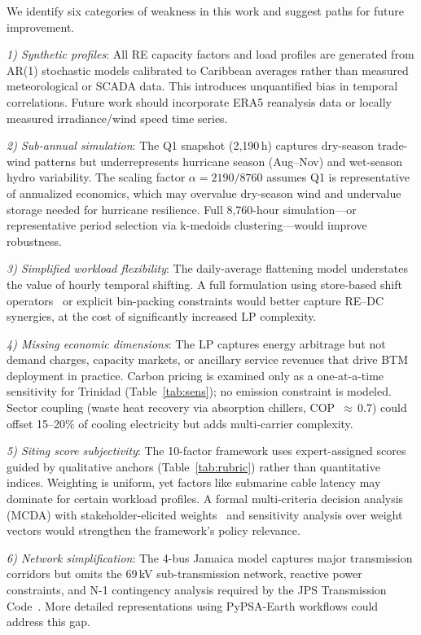 \documentclass[conference,10pt]{IEEEtran}
\begin{document}
We identify six categories of weakness in this work and suggest paths for future improvement.

\textit{1) Synthetic profiles}: All RE capacity factors and load profiles are generated from AR(1) stochastic models calibrated to Caribbean averages rather than measured meteorological or SCADA data. This introduces unquantified bias in temporal correlations. Future work should incorporate ERA5 reanalysis data or locally measured irradiance/wind speed time series.

\textit{2) Sub-annual simulation}: The Q1 snapshot (2{,}190\,h) captures dry-season trade-wind patterns but underrepresents hurricane season (Aug--Nov) and wet-season hydro variability. The scaling factor $\alpha = 2190/8760$ assumes Q1 is representative of annualized economics, which may overvalue dry-season wind and undervalue storage needed for hurricane resilience. Full 8{,}760-hour simulation---or representative period selection via k-medoids clustering---would improve robustness.

\textit{3) Simplified workload flexibility}: The daily-average flattening model understates the value of hourly temporal shifting. A full formulation using store-based shift operators~\cite{google247} or explicit bin-packing constraints would better capture RE--DC synergies, at the cost of significantly increased LP complexity.

\textit{4) Missing economic dimensions}: The LP captures energy arbitrage but not demand charges, capacity markets, or ancillary service revenues that drive BTM deployment in practice. Carbon pricing is examined only as a one-at-a-time sensitivity for Trinidad (Table~\ref{tab:sens}); no emission constraint is modeled. Sector coupling (waste heat recovery via absorption chillers, COP~$\approx$\,0.7) could offset 15--20\% of cooling electricity but adds multi-carrier complexity.

\textit{5) Siting score subjectivity}: The 10-factor framework uses expert-assigned scores guided by qualitative anchors (Table~\ref{tab:rubric}) rather than quantitative indices. Weighting is uniform, yet factors like submarine cable latency may dominate for certain workload profiles. A formal multi-criteria decision analysis (MCDA) with stakeholder-elicited weights~\cite{uli2024} and sensitivity analysis over weight vectors would strengthen the framework's policy relevance.

\textit{6) Network simplification}: The 4-bus Jamaica model captures major transmission corridors but omits the 69\,kV sub-transmission network, reactive power constraints, and N-1 contingency analysis required by the JPS Transmission Code~\cite{jps_grid}. More detailed representations using PyPSA-Earth workflows could address this gap.
\end{document}
